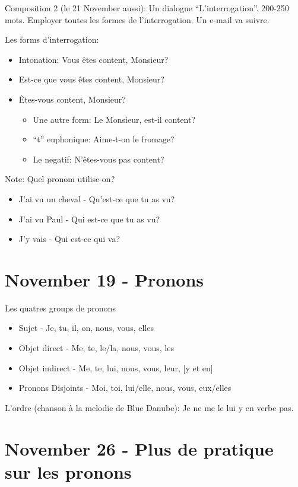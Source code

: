 \documentclass{report}
\begin{document}
Composition 2 (le 21 November aussi): Un dialogue ``L'interrogation''. 200-250 mots. Employer toutes les formes de l'interrogation. Un e-mail va suivre.

Les forms d'interrogation:
\begin{itemize}
\item Intonation: Vous \^etes content, Monsieur?
\item Est-ce que vous \^etes content, Monsieur?
\item \^Etes-vous content, Monsieur?
\begin{itemize}
\item Une autre form: Le Monsieur, est-il content?
\item ``t'' euphonique: Aime-t-on le fromage?
\item Le negatif: N'\^etes-vous pas content?
\end{itemize}
\end{itemize}

Note: Quel pronom utilise-on? \begin{itemize}
\item J'ai vu un cheval - Qu'est-ce que tu as vu?
\item J'ai vu Paul - Qui est-ce que tu as vu?
\item J'y vais - Qui est-ce qui va?
\end{itemize}

\section{November 19 - Pronons}

Les quatres groups de pronons
\begin{itemize}
\item Sujet - Je, tu, il, on, nous, vous, elles
\item Objet direct - Me, te, le/la, nous, vous, les
\item Objet indirect - Me, te, lui, nous, vous, leur, [y et en]
\item Pronons Disjoints - Moi, toi, lui/elle, nous, vous, eux/elles
\end{itemize}

L'ordre (chanson \`a la melodie de Blue Danube): Je ne me le lui y en verbe pas. 

\section{November 26 - Plus de pratique sur les pronons}
\end{document}

